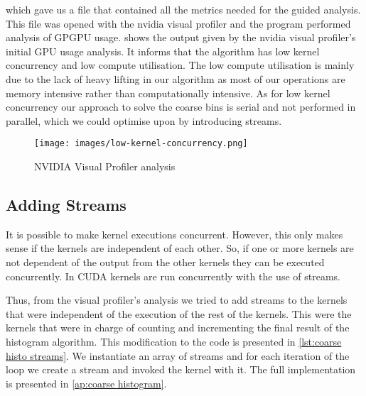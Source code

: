 \begin{quote}
\end{quote}

which gave us a file that contained all the metrics needed for the guided analysis.
This file was opened with the nvidia visual profiler and the program performed analysis of GPGPU usage.
 shows the output given by the nvidia visual profiler's initial GPU usage analysis.
It informs that the algorithm has low kernel concurrency and low compute utilisation.
The low compute utilisation is mainly due to the lack of heavy lifting in our algorithm as most of our operations are memory intensive rather than computationally intensive.
As for low kernel concurrency our approach to solve the coarse bins is serial and not performed in parallel, which we could optimise upon by introducing streams.
\begin{figure}[htb]
  \centering
  \texttt{[image: images/low-kernel-concurrency.png]}
  \caption{NVIDIA Visual Profiler analysis}
  \label{fig:first impl}
\end{figure}

\subsection{Adding Streams}

It is possible to make kernel executions concurrent.
However, this only makes sense if the kernels are independent of each other.
So, if one or more kernels are not dependent of the output from the other kernels they can be executed concurrently.
In CUDA kernels are run concurrently with the use of streams.

Thus, from the visual profiler's analysis we tried to add streams to the kernels that were independent of the execution of the rest of the kernels.
This were the kernels that were in charge of counting and incrementing the final result of the histogram algorithm.
This modification to the code is presented in \cref{lst:coarse histo streams}.
We instantiate an array of streams and for each iteration of the loop we create a stream and invoked the kernel with it.
The full implementation is presented in \cref{ap:coarse histogram}.

